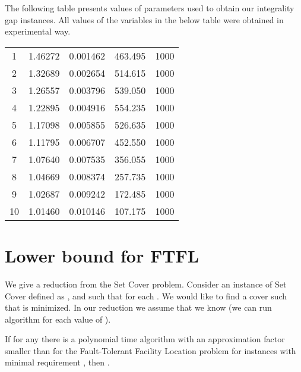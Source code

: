 \documentclass{llncs}
\begin{document}
The following table presents values of parameters used to obtain our integrality gap instances. All values of the variables in the below table were obtained in experimental way.
\begin{center}
  \begin{tabular}{ c | c | c | c | c }
     &  &  &  &  \\ \hline
    1  & 1.46272 & 0.001462 & 463.495 & 1000 \\ \hline
    2  & 1.32689 & 0.002654 & 514.615 & 1000 \\ \hline
    3  & 1.26557 & 0.003796 & 539.050 & 1000 \\ \hline
    4  & 1.22895 & 0.004916 & 554.235 & 1000 \\ \hline 
    5  & 1.17098 & 0.005855 & 526.635 & 1000 \\ \hline
    6  & 1.11795 & 0.006707 & 452.550 & 1000 \\ \hline
    7  & 1.07640 & 0.007535 & 356.055 & 1000 \\ \hline
    8  & 1.04669 & 0.008374 & 257.735 & 1000 \\ \hline
    9  & 1.02687 & 0.009242 & 172.485 & 1000 \\ \hline
    10 & 1.01460 & 0.010146 & 107.175 & 1000 \\
  \end{tabular}
\end{center}

\section{Lower bound for FTFL}
We give a reduction from the Set Cover problem. Consider an instance of Set Cover defined as , and  such that  for each . We would like to find a cover  such that  is minimized. In our reduction we assume that we know  (we can run algorithm for each value of ).

\begin{theorem}
\label{hardness_of_FTFL}
If for any  there is a polynomial time algorithm with an approximation factor smaller than  for the Fault-Tolerant Facility Location problem for instances with minimal requirement , then .
\end{theorem}
\end{document}
